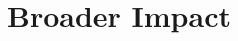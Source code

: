 \documentclass{article}
\newcommand{\vx}{\mathbf{x}}
\newcommand{\expectation}{\mathbb{E}}
\newcommand{\comment}[1]{{\color{red} #1}}
\begin{document}




%

\section*{Broader Impact}

\end{document}
